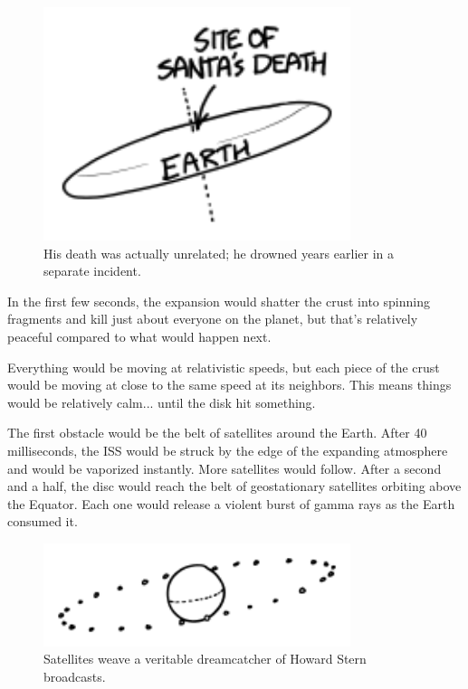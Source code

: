 {\begin{figure}[!htbp]
\centering
\includegraphics[scale=0.5, max width=0.8\textwidth]{imgs/a/92/day_polar.png}
\caption{His death was actually unrelated; he drowned years earlier in a separate incident.}
\end{figure}

{In the first few seconds, the expansion would shatter the crust into spinning fragments and kill just about everyone on the planet, but that's relatively peaceful compared to what would happen next.}

{Everything would be moving at relativistic speeds, but each piece of the crust would be moving at close to the same speed at its neighbors. This means things would be relatively calm... until the disk hit something.}

{The first obstacle would be the belt of satellites around the Earth. After 40 milliseconds, the ISS would be struck by the edge of the expanding atmosphere and would be vaporized instantly. More satellites would follow. After a second and a half, the disc would reach the belt of geostationary satellites orbiting above the Equator. Each one would release a violent burst of gamma rays as the Earth consumed it.}

\begin{figure}[!htbp]
\centering
\includegraphics[scale=0.5, max width=0.8\textwidth]{imgs/a/92/day_geo.png}
\caption{Satellites weave a veritable dreamcatcher of Howard Stern broadcasts.}
\end{figure}

}
